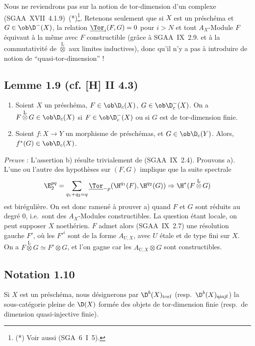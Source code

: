 Nous ne reviendrons pas sur la notion de tor-dimension d'un complexe (SGAA~XVII~4.1.9)~(*)\footnote{(*) Voir aussi (SGA~6~I~5).}. Retenons seulement que si $X$ est un préschéma et $G \in \ob \D^{-}(X)$, la relation $\underline{\Tor}_i(F,G) = 0$ pour $i > N$ et tout $A_X$-Module $F$ équivaut à la même avec $F$ constructible (grâce à SGAA~IX~2.9. et à la commutativité de $\mathop{\otimes}\limits^{\mathrm{L}}$ aux limites inductives), donc qu'il n'y a pas à introduire de notion de ``quasi-tor-dimension'' !

\subsection*{Lemme 1.9 (cf. [H] II 4.3)}
\begin{enumerate}
\item[a)] Soient $X$ un préschéma, $F \in \ob \D_c(X)$, $G \in \ob \D_c^{-}(X)$. On a $F \mathop{\otimes}\limits^{\mathrm{L}} G \in \ob \D_c(X)$ si $F \in \ob \D_c^{-}(X)$ ou si $G$ est de tor-dimension finie.
\item[b)] Soient $f : X \to Y$ un morphisme de préschémas, et $G \in \ob \D_c(Y)$. Alors, $f^{*}(G) \in \ob \D_c(X)$.
\end{enumerate}

\emph{Preuve} : L'assertion b) résulte trivialement de (SGAA~IX~2.4). Prouvons a). L'une ou l'autre des hypothèses sur $(F,G)$ implique que la suite spectrale
\[
\E_2^{pq} = \sum_{q_1+q_2=q} \underline{\Tor}_{-p}(\H^{q_1}(F), \H^{q_2}(G)) \Rightarrow \H^{*}(F \mathop{\otimes}\limits^{\mathrm{L}} G)
\]
est birégulière. On est donc ramené à prouver a) quand $F$ et $G$ sont réduits au degré $0$, i.e.~sont des $A_X$-Modules constructibles. La question étant locale, on peut supposer $X$ noethérien. $F$ admet alors (SGAA~IX~2.7) une résolution gauche $F'$, où les $F'^i$ sont de la forme $A_{U,X}$, avec $U$ étale et de type fini sur $X$. On a $F \mathop{\otimes}\limits^{\mathrm{L}} G \simeq F' \otimes G$, et l'on gagne car les $A_{U,X} \otimes G$ sont constructibles.

\subsection*{Notation 1.10}
Si $X$ est un préschéma, nous désignerons par $\D^{b}(X)_{\mathrm{torf}}$ (resp.~$\D^{b}(X)_{\mathrm{qinjf}}$) la sous-catégorie pleine de $\D(X)$ formée des objets de tor-dimension finie (resp.~de dimension quasi-injective finie).

